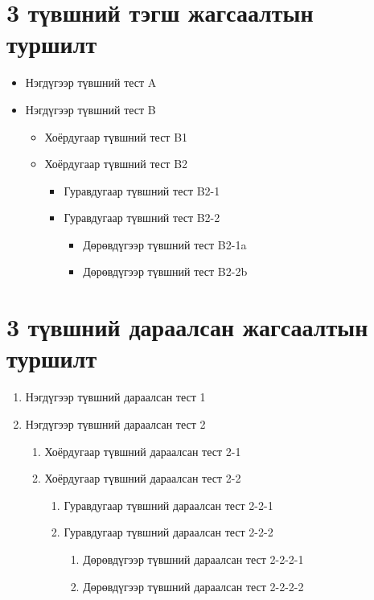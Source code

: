 \documentclass[nm]{../../elegantbook}
\begin{document}
\section{3 түвшний тэгш жагсаалтын туршилт}
\begin{itemize}
\item Нэгдүгээр түвшний тест A
\item Нэгдүгээр түвшний тест B
    \begin{itemize}
    \item Хоёрдугаар түвшний тест B1
    \item Хоёрдугаар түвшний тест B2
        \begin{itemize}
        \item Гуравдугаар түвшний тест B2-1
        \item Гуравдугаар түвшний тест B2-2
            \begin{itemize}
            \item Дөрөвдүгээр түвшний тест B2-1a
            \item Дөрөвдүгээр түвшний тест B2-2b
            \end{itemize}
        \end{itemize}
    \end{itemize}
\end{itemize}

\section{3 түвшний дараалсан жагсаалтын туршилт}
\begin{enumerate}
\item Нэгдүгээр түвшний дараалсан тест 1
\item Нэгдүгээр түвшний дараалсан тест 2
    \begin{enumerate}
    \item Хоёрдугаар түвшний дараалсан тест 2-1
    \item Хоёрдугаар түвшний дараалсан тест 2-2
        \begin{enumerate}
        \item Гуравдугаар түвшний дараалсан тест 2-2-1
        \item Гуравдугаар түвшний дараалсан тест 2-2-2
            \begin{enumerate}
            \item Дөрөвдүгээр түвшний дараалсан тест 2-2-2-1
            \item Дөрөвдүгээр түвшний дараалсан тест 2-2-2-2
            \end{enumerate}
        \end{enumerate}
    \end{enumerate}
\end{enumerate}
\end{document}
